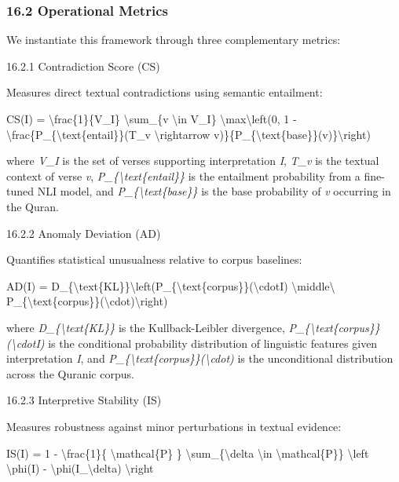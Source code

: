 \documentclass[12pt,a4paper]{article}
\begin{document}
\subsubsection{16.2 Operational Metrics}\label{operational-metrics}

We instantiate this framework through three complementary metrics:

16.2.1 Contradiction Score (CS)

Measures direct textual contradictions using semantic entailment:

CS(I) = \textbackslash frac\{1\}\{\textbar V\_I\textbar\}
\textbackslash sum\_\{v \textbackslash in V\_I\}
\textbackslash max\textbackslash left(0, 1 -
\textbackslash frac\{P\_\{\textbackslash text\{entail\}\}(T\_v
\textbackslash rightarrow
v)\}\{P\_\{\textbackslash text\{base\}\}(v)\}\textbackslash right)

where \emph{V\_I} is the set of verses supporting interpretation
\emph{I}, \emph{T\_v} is the textual context of verse \emph{v},
\emph{P\_\{\textbackslash text\{entail\}\}} is the entailment
probability from a fine-tuned NLI model, and
\emph{P\_\{\textbackslash text\{base\}\}} is the base probability of
\emph{v} occurring in the Quran.

16.2.2 Anomaly Deviation (AD)

Quantifies statistical unusualness relative to corpus baselines:

AD(I) =
D\_\{\textbackslash text\{KL\}\}\textbackslash left(P\_\{\textbackslash text\{corpus\}\}(\textbackslash cdot\textbar I)
\textbackslash middle\textbackslash\textbar{}
P\_\{\textbackslash text\{corpus\}\}(\textbackslash cdot)\textbackslash right)

where \emph{D\_\{\textbackslash text\{KL\}\}} is the Kullback-Leibler
divergence,
\emph{P\_\{\textbackslash text\{corpus\}\}(\textbackslash cdot\textbar I)}
is the conditional probability distribution of linguistic features given
interpretation \emph{I}, and
\emph{P\_\{\textbackslash text\{corpus\}\}(\textbackslash cdot)} is the
unconditional distribution across the Quranic corpus.

16.2.3 Interpretive Stability (IS)

Measures robustness against minor perturbations in textual evidence:

IS(I) = 1 - \textbackslash frac\{1\}\{\textbar{}
\textbackslash mathcal\{P\} \textbar\}
\textbackslash sum\_\{\textbackslash delta \textbackslash in
\textbackslash mathcal\{P\}\} \textbackslash left\textbar{}
\textbackslash phi(I) - \textbackslash phi(I\_\textbackslash delta)
\textbackslash right\textbar{}
\end{document}
